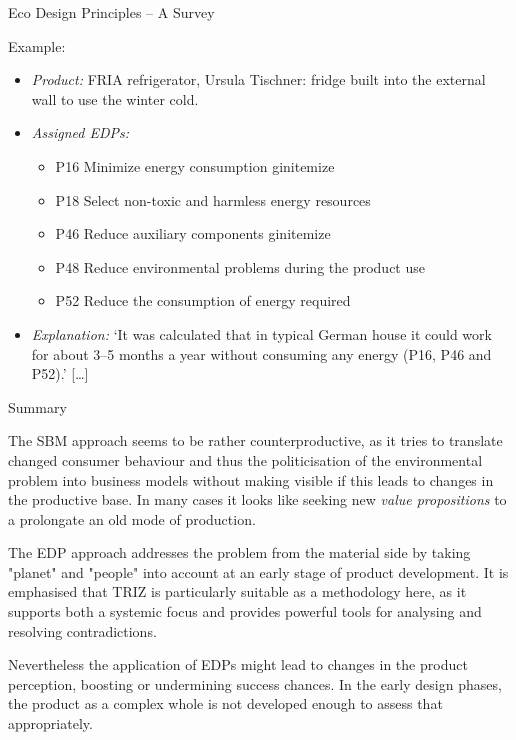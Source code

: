 \documentclass{beamer}
\begin{document}
\begin{frame}{Eco Design Principles -- A Survey}

Example:
\begin{itemize}
\item \emph{Product:} FRIA refrigerator, Ursula Tischner: fridge built into
  the external wall to use the winter cold.
\item \emph{Assigned EDPs:}
  \begin{itemize}
  \item P16 Minimize energy consumption gin{itemize}
  \item P18 Select non-toxic and harmless energy resources 
  \item P46 Reduce auxiliary components gin{itemize}
  \item P48 Reduce environmental problems during the product use
  \item P52 Reduce the consumption of energy required
  \end{itemize}
\item \emph{Explanation:} ‘It was calculated that in typical German house it
  could work for about 3–5 months a year without consuming any energy (P16,
  P46 and P52).’ [\ldots]
\end{itemize}

\end{frame}

\begin{frame}{Summary}\small

The SBM approach seems to be rather counterproductive, as it tries to
translate changed consumer behaviour and thus the politicisation of the
environmental problem into business models without making visible if this
leads to changes in the productive base.  In many cases it looks like seeking
new \emph{value propositions} to a prolongate an old mode of production.

The EDP approach addresses the problem from the material side by taking
"planet" and "people" into account at an early stage of product development.
It is emphasised that TRIZ is particularly suitable as a methodology here, as
it supports both a systemic focus and provides powerful tools for analysing
and resolving contradictions.

Nevertheless the application of EDPs might lead to changes in the product
perception, boosting or undermining success chances. In the early design
phases, the product as a complex whole is not developed enough to assess that
appropriately.

\end{frame}
\end{document}
